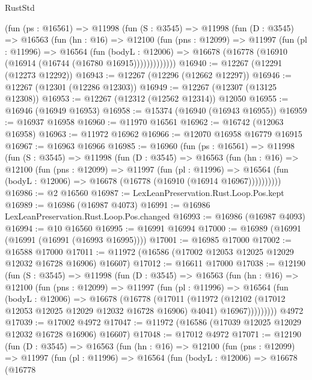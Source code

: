 \begin{lexlean}{RustStd}
\begin{coremodule}
      (fun (ps : @16561) =>
      @11998
        (fun (S : @3545) =>
        @11998
          (fun (D : @3545) =>
          @16563
            (fun (hn : @16) =>
            @12100
              (fun (pns : @12099) =>
              @11997
                (fun (pl : @11996) =>
                @16564
                  (fun (bodyL : @12006) =>
                  @16678 (@16778 (@16910 (@16914 (@16744 (@16780 @16915)))))))))))))
@16940 := @12267 (@12291 (@12273 @12292))
@16943 := @12267 (@12296 (@12662 @12297))
@16946 := @12267 (@12301 (@12286 @12303))
@16949 := @12267 (@12307 (@13125 @12308))
@16953 := @12267 (@12312 (@12562 @12314)) @12050
@16955 := @16946 (@16949 @16953)
@16958 := @15374 (@16940 (@16943 @16955))
@16959 := @16937 @16958
@16960 := @11970 @16561
@16962 := @16742 (@12063 @16958)
@16963 := @11972 @16962
@16966 := @12070 @16958 @16779 @16915
@16967 := @16963 @16966
@16985 := @16960
    (fun (ps : @16561) =>
    @11998
      (fun (S : @3545) =>
      @11998
        (fun (D : @3545) =>
        @16563
          (fun (hn : @16) =>
          @12100
            (fun (pns : @12099) =>
            @11997
              (fun (pl : @11996) =>
              @16564 (fun (bodyL : @12006) => @16678 (@16778 (@16910 (@16914 @16967))))))))))
@16986 := @2 @16560
@16987 := LexLeanPreservation.Rust.Loop.Pos.kept
@16989 := @16986 (@16987 @4073)
@16991 := @16986 LexLeanPreservation.Rust.Loop.Pos.changed
@16993 := @16986 (@16987 @4093)
@16994 := @10 @16560
@16995 := @16991 @16994
@17000 := @16989 (@16991 (@16991 (@16991 (@16993 @16995))))
@17001 := @16985 @17000
@17002 := @16588 @17000
@17011 := @11972 (@16586 (@17002 @12053 @12025 @12029 @12032 @16728 @16906) @16607)
@17012 := @16611 @17000
@17038 := @12190
    (fun (S : @3545) =>
    @11998
      (fun (D : @3545) =>
      @16563
        (fun (hn : @16) =>
        @12100
          (fun (pns : @12099) =>
          @11997
            (fun (pl : @11996) =>
            @16564
              (fun (bodyL : @12006) =>
              @16678
                (@16778
                  (@17011
                    (@11972
                      (@12102 (@17012 @12053 @12025 @12029 @12032 @16728 @16906) @4041)
                      @16967)))))))))
    @4972
@17039 := @17002 @4972
@17047 := @11972 (@16586 (@17039 @12025 @12029 @12032 @16728 @16906) @16607)
@17048 := @17012 @4972
@17071 := @12190
    (fun (D : @3545) =>
    @16563
      (fun (hn : @16) =>
      @12100
        (fun (pns : @12099) =>
        @11997
          (fun (pl : @11996) =>
          @16564
            (fun (bodyL : @12006) =>
            @16678
              (@16778

\end{coremodule}
\end{lexlean}
